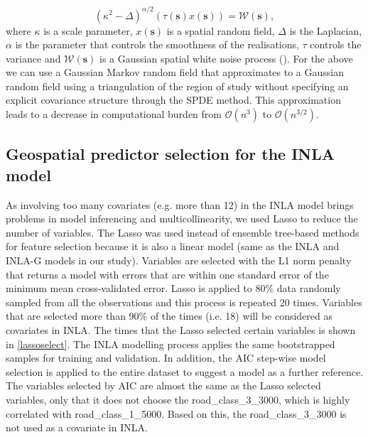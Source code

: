 \documentclass{article}
\begin{document}
\begin{equation}\label{eqn:eq9}
(\kappa^{2} - \Delta)^{\alpha/2}(\tau(\boldsymbol{s}) x(\boldsymbol{s})) = \boldsymbol{\mathcal{W}(s)},
\end{equation}
where $\kappa$ is a scale parameter, $x(\boldsymbol{s})$ is a spatial random field, $\Delta$ is the Laplacian, $\alpha$ is the parameter that controls the smoothness of the realisations, $\tau$ controls the variance and $\boldsymbol{\mathcal{W}(s)}$  is a Gaussian spatial white noise process (\cite{lindgren2015bayesian}). For the above we can use a Gaussian Markov random field that approximates to a Gaussian random field using a triangulation of the region of study without specifying an explicit covariance structure through the SPDE method. This approximation leads to a decrease in computational burden from $\mathcal{O}(n^{3})$ to $\mathcal{O}(n^{3/2})$. 



\subsection{Geospatial predictor selection for the INLA model} 

As involving too many covariates (e.g. more than 12) in the INLA model brings problems in model inferencing and multicollinearity, we used Lasso to reduce the number of variables. The Lasso was used instead of ensemble tree-based methods for feature selection because it is also a linear model (same as the INLA and INLA-G models in our study). Variables are selected with the L1 norm penalty that returns a model with errors that are within one standard error of the minimum mean cross-validated error. Lasso is applied to 80\% data randomly sampled from all the observations and this process is repeated  20 times. Variables that are selected more than 90\% of the times (i.e. 18) will be considered as covariates in INLA. The times that the Lasso selected certain variables is shown in \cref{lassoselect}. The INLA modelling process applies the same bootstrapped samples for training and validation.  In addition, the AIC step-wise model selection is applied to the entire dataset to suggest a model as a further reference. The variables selected by AIC are almost the same as the Lasso selected variables, only that it does not choose the road\_class\_3\_3000, which is highly correlated with  road\_class\_1\_5000. Based on this, the road\_class\_3\_3000 is not used as a covariate in INLA.  
\end{document}
